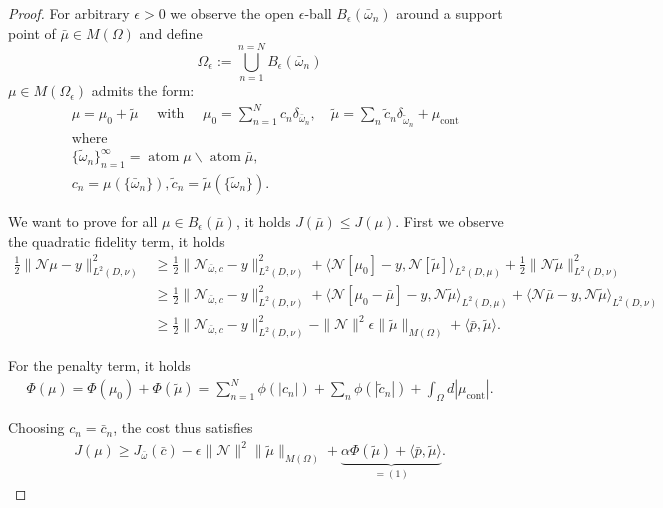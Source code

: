 \documentclass[12pt,fleqn]{amsart}
\theoremstyle{definition}
\DeclareMathOperator*{\atom}{atom}
\DeclareMathOperator*{\cont}{cont}
\begin{document}
\begin{proof}
For arbitrary $\epsilon > 0$ we observe the open $\epsilon$-ball $B_\epsilon(\bar{\omega}_n)$ around a support point of $\bar{\mu} \in M(\Omega)$ and define 
\begin{equation*}
    \Omega_\epsilon := \bigcup_{n = 1}^{n = N} B_\epsilon (\bar{\omega}_n)
\end{equation*} 
$\mu \in M (\Omega_\epsilon)$ admits the form:
\begin{align*}
	&\mu = \mu_0 + \tilde{\mu} \quad\text{ with }\quad \mu_0 = \sum_{n = 1}^N c_n \delta_{\bar{\omega}_n},
    \quad 
    \tilde{\mu} = \sum_n \tilde{c}_n \delta_{\tilde{\omega}_n} + \mu_{\cont}\\
	&\text{where}\\
	& \{\tilde{\omega}_n \}_{n = 1}^\infty = \atom \mu \backslash \atom \bar{\mu}, \\
	& c_n = \mu(\{\bar{\omega}_n\}), \tilde{c}_n = \tilde{\mu}(\{\tilde{\omega}_n\}).
\end{align*}

We want to prove for all $\mu \in B_\epsilon(\bar{\mu})$, it holds $J(\bar{\mu}) \le J(\mu)$. First we observe the quadratic fidelity term, it holds
\begin{align*}
	\frac{1}{2}\|\mathcal{N}\mu - y\|_{L^2(D, \nu)}^2 &\ge \frac{1}{2} \|\mathcal{N}_{\bar{\omega}, c} - y\|^2_{L^2(D, \nu)} + \langle \mathcal{N}[\mu_0] - y, \mathcal{N} [\tilde{\mu}] \rangle_{L^2(D, \mu)} + \frac{1}{2}\|\mathcal{N}\tilde{\mu}\|^2_{L^2(D, \nu)} \\
	& \ge \frac{1}{2} \|\mathcal{N}_{\bar{\omega}, c} - y\|^2_{L^2(D, \nu)} + \langle \mathcal{N}[\mu_0 - \bar{\mu}] - y, \mathcal{N}\tilde{\mu} \rangle_{L^2(D, \mu)} + \langle \mathcal{N} \bar{\mu} - y, \mathcal{N} \tilde{\mu}\rangle_{L^2(D, \nu)}\\
	& \ge  \frac{1}{2} \|\mathcal{N}_{\bar{\omega}, c} - y\|^2_{L^2(D, \nu)} - \|\mathcal{N}\|^2 \epsilon \|\tilde{\mu}\|_{M(\Omega)} + \langle \bar{p}, \tilde{\mu}\rangle.
\end{align*}

For the penalty term, it holds
\begin{align*}
	\Phi(\mu) = \Phi(\mu_0) + \Phi(\tilde{\mu}) = \sum_{n = 1}^N \phi(|c_n|) + \sum_n \phi(|\tilde{c}_n|) + \int_\Omega d|\mu_{\cont}|.
\end{align*}

Choosing $c_n = \bar{c}_n$, the cost thus satisfies
\begin{align*}
	J(\mu) \ge J_{\bar{\omega}}(\bar{c}) - \epsilon \|\mathcal{N}\|^2 \|\tilde{\mu}\|_{M(\Omega)} + \underbrace{\alpha \Phi(\tilde{\mu}) + \langle \bar{p}, \tilde{\mu} \rangle}_{= (1)}.
\end{align*}


\end{proof}
\end{document}
